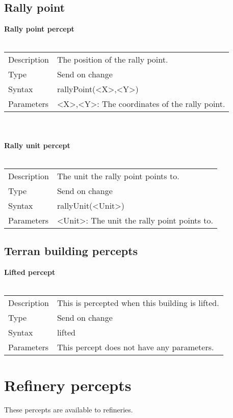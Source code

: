 \documentclass[english,11pt]{report}
\begin{document}
\subsection{Rally point}
\textbf{Rally point percept}\\
\\
\begin{tabularx}{\textwidth}{lX}
 Description & The position of the rally point. \\
 Type & Send on change \\
 Syntax & rallyPoint(<X>,<Y>) \\
 Parameters &   <X>,<Y>: The coordinates of the rally point.
\end{tabularx}\\
\\
\newpage
\textbf{Rally unit percept}\\
\\
\begin{tabularx}{\textwidth}{lX}
 Description & The unit the rally point points to. \\
 Type & Send on change \\
 Syntax & rallyUnit(<Unit>) \\
 Parameters &   <Unit>: The unit the rally point points to.
\end{tabularx}

\subsection{Terran building percepts}
\textbf{Lifted percept}\\
\\
\begin{tabularx}{\textwidth}{lX}
 Description & This is percepted when this building is lifted. \\
 Type & Send on change \\
 Syntax & lifted \\
 Parameters &   This percept does not have any parameters.
\end{tabularx}


\newpage
\section{Refinery percepts}
These percepts are available to refineries.
\end{document}
